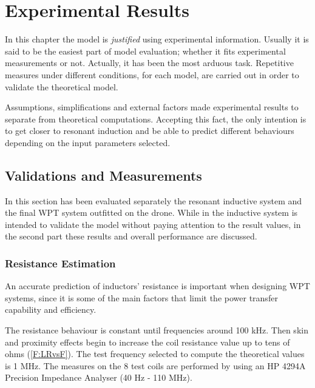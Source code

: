 \chapter{Experimental Results} \label{C:experimental}
In this chapter the model is \textit{justified} using experimental information. Usually it is said to be the easiest part of model evaluation; whether it fits experimental measurements or not. Actually, it has been the most arduous task. Repetitive measures under different conditions, for each model, are carried out in order to validate the theoretical model.

Assumptions, simplifications and external factors made experimental results to separate from theoretical computations. Accepting this fact, the only intention is to get closer to resonant induction and be able to predict different behaviours depending on the input parameters selected.

	\section{Validations and Measurements}
In this section has been evaluated separately the resonant inductive system and the final WPT system outfitted on the drone. While in the inductive system is intended to validate the model without paying attention to the result values, in the second part these results and overall performance are discussed.


	\subsection{Resistance Estimation}
An accurate prediction of inductors' resistance is important when designing WPT systems, since it is some of the main factors that limit the power transfer capability and efficiency.

The resistance behaviour is constant until frequencies around 100 kHz. Then skin and proximity effects begin to increase the coil resistance value up to tens of ohms (\ref{F:LRvsF}). The test frequency selected to compute the theoretical values is 1 MHz. The measures on the 8 test coils are performed by using an HP 4294A Precision Impedance Analyser (40 Hz - 110 MHz). 


